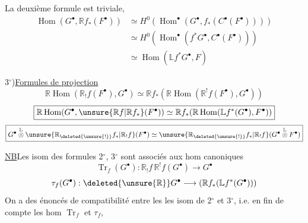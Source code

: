  La deuxième formule est triviale,
\[
\begin{aligned}
\operatorname{Hom}(G^\bullet,\mathbb{R}f_*(F^\bullet))
 &\simeq H^0(\operatorname{Hom}^\bullet(G^\bullet,f_*(C^\bullet(F^\bullet))))\\
 &\simeq H^0(\operatorname{Hom}^\bullet(f^*G^\bullet,C^\bullet(F^\bullet)))\\
 &\simeq\operatorname{Hom}(\mathbb{L}f^*G^\bullet,F)
\end{aligned}
\]

3$^\circ$)\quad \uline{Formules de projection}
\[
\boxed{\mathbb{R}\operatorname{Hom}(\mathbb{R}_!f(F^\bullet),G^\bullet)
 \simeq \mathbb{R}f_*(\mathbb{R}\operatorname{Hom}(\mathbb{R}^!f(F^\bullet),G^\bullet))}
\]
\[
\boxed{\mathbb{R}\operatorname{Hom}(G^\bullet,\unsure{\mathbb{R}f|\mathbb{R}f_*}(F^\bullet))
 \simeq \mathbb{R}f_*(\mathbb{R}\operatorname{Hom}(\mathbb{L}f^*(G^\bullet),F^\bullet))}
\]
\[
\boxed{G^\bullet\overset{\mathbb{L}}{\otimes}\unsure{\mathbb{R}_{\deleted{\unsure{!}}}f_*|\mathbb{R}_!f}(F^\bullet)
 \simeq\unsure{\mathbb{R}_{\deleted{\unsure{!}}}f_*|\mathbb{R}_!f}
 (G^\bullet\overset{\mathbb{L}}{\otimes}F^\bullet)}
\]

\uline{NB}\quad Les  isom des formules 2$^\circ$, 3$^\circ$
sont associés aux hom canoniques
\[
\operatorname{Tr}_f(G^\bullet):
 \mathbb{R}_!f\,\mathbb{R}^!f(G^\bullet)\longrightarrow G^\bullet
\]
\[
\tau_f(G^\bullet):
 \deleted{\unsure{\mathbb{R}}}G^\bullet\longrightarrow(\mathbb{R}f_*(\mathbb{L}f^*(G^\bullet)))
\]
On a des énoncés de compatibilité
entre les les isom de 2$^\circ$ et 3$^\circ$, i.e. en
fin de compte les hom $\operatorname{Tr}_f$ et $\tau_f$,
